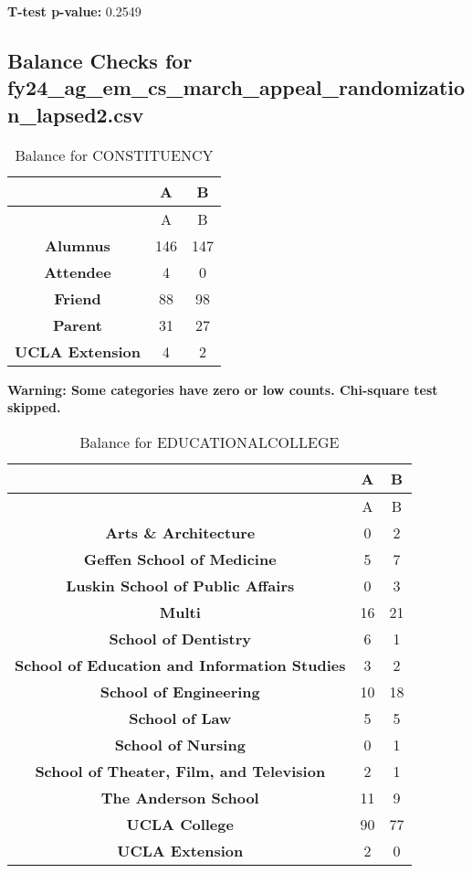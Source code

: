 \documentclass[
]{article}
\begin{document}
\textbf{T-test p-value:} 0.2549\\
\pagebreak \clearpage

\subsection{Balance Checks for
fy24\_ag\_em\_cs\_march\_appeal\_randomization\_lapsed2.csv}\label{balance-checks-for-fy24_ag_em_cs_march_appeal_randomization_lapsed2.csv}

\begin{longtable}[]{@{}ccc@{}}
\caption{Balance for CONSTITUENCY}\tabularnewline
\toprule\noalign{}
~ & A & B \\
\midrule\noalign{}
\endfirsthead
\toprule\noalign{}
~ & A & B \\
\midrule\noalign{}
\endhead
\bottomrule\noalign{}
\endlastfoot
\textbf{Alumnus} & 146 & 147 \\
\textbf{Attendee} & 4 & 0 \\
\textbf{Friend} & 88 & 98 \\
\textbf{Parent} & 31 & 27 \\
\textbf{UCLA Extension} & 4 & 2 \\
\end{longtable}

\textbf{Warning: Some categories have zero or low counts. Chi-square
test skipped.} \pagebreak

\begin{longtable}[]{@{}ccc@{}}
\caption{Balance for EDUCATIONALCOLLEGE}\tabularnewline
\toprule\noalign{}
~ & A & B \\
\midrule\noalign{}
\endfirsthead
\toprule\noalign{}
~ & A & B \\
\midrule\noalign{}
\endhead
\bottomrule\noalign{}
\endlastfoot
\textbf{Arts \& Architecture} & 0 & 2 \\
\textbf{Geffen School of Medicine} & 5 & 7 \\
\textbf{Luskin School of Public Affairs} & 0 & 3 \\
\textbf{Multi} & 16 & 21 \\
\textbf{School of Dentistry} & 6 & 1 \\
\textbf{School of Education and Information Studies} & 3 & 2 \\
\textbf{School of Engineering} & 10 & 18 \\
\textbf{School of Law} & 5 & 5 \\
\textbf{School of Nursing} & 0 & 1 \\
\textbf{School of Theater, Film, and Television} & 2 & 1 \\
\textbf{The Anderson School} & 11 & 9 \\
\textbf{UCLA College} & 90 & 77 \\
\textbf{UCLA Extension} & 2 & 0 \\
\end{longtable}
\end{document}
